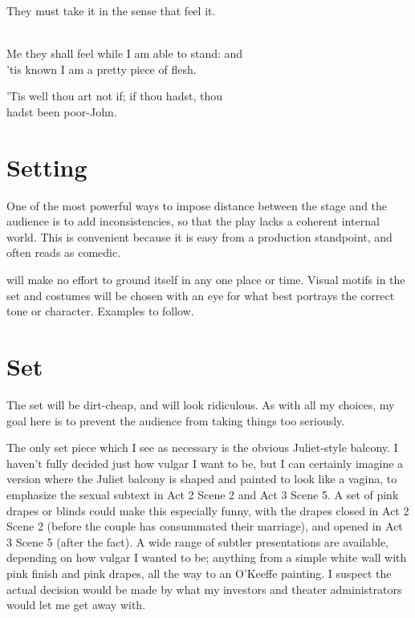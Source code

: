 \begin{dialogue}
   They  must take it in the sense that feel it.

    \\
  Me they shall feel while I am able to stand: and \\
  'tis known I am a pretty piece of flesh.

   'Tis well thou art not if; if thou hadst, thou \\
  hadst been  poor-John.
\end{dialogue}

\section*{Setting}

One of the most powerful ways to impose distance between the stage and the audience is to
add inconsistencies, so that the play lacks a coherent internal world. This is convenient
because it is easy from a production standpoint, and often reads as comedic.

\theproduction{} will make no effort to ground itself in any one place or time. Visual
motifs in the set and costumes will be chosen with an eye for what best portrays the
correct tone or character. Examples to follow.

\section*{Set}

The set will be dirt-cheap, and will look ridiculous. As with all my choices, my goal here
is to prevent the audience from taking things too seriously.

The only set piece which I see as necessary is the obvious Juliet-style balcony. I haven't
fully decided just how vulgar I want \theproduction{} to be, but I can certainly imagine a
version where the Juliet balcony is shaped and painted to look like a vagina, to emphasize
the sexual subtext in Act 2 Scene 2 and Act 3 Scene 5. A set of pink drapes or blinds
could make this especially funny, with the drapes closed in Act 2 Scene 2 (before the
couple has consummated their marriage), and opened in Act 3 Scene 5 (after the fact). A
wide range of subtler presentations are available, depending on how vulgar I wanted to be;
anything from a simple white wall with pink finish and pink drapes, all the way to an
O'Keeffe painting. I suspect the actual decision would be made by what my investors and
theater administrators would let me get away with.

